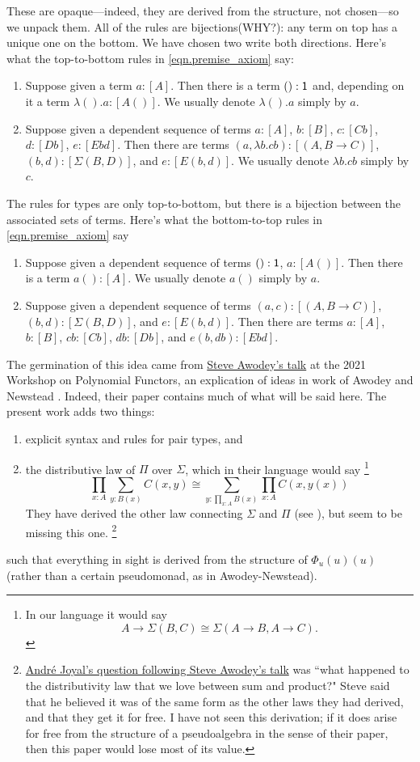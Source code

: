 \documentclass[11pt, one side, article]{memoir}
\theoremstyle{definition}
\theoremstyle{plain}
\newcommand{\0}{\textsf{0}}
\newcommand{\1}{\tn{\textsf{1}}}
\begin{document}
These are opaque---indeed, they are derived from the structure, not chosen---so we unpack them. All of the rules are bijections(WHY?): any term on top has a unique one on the bottom. We have chosen two write both directions. Here's what the top-to-bottom rules in \eqref{eqn.premise_axiom} say:
\begin{enumerate}
	\item Suppose given a term $a:[A]$. Then there is a term $():\1$ and, depending on it a term $\lambda ().a:[A()]$. We usually denote $\lambda ().a$ simply by $a$.
	\item Suppose given a dependent sequence of terms $a:[A]$, $b:[B]$, $c:[C b]$, $d:[D b]$, $e: [E b d]$. Then there are terms $(a,\lambda b.cb):[(A,B\to C)]$, $(b, d):[\Sigma(B,D)]$, and $e:[E(b,d)]$. We usually denote $\lambda b.cb$ simply by $c$.
\end{enumerate}
The rules for types are only top-to-bottom, but there is a bijection between the associated sets of terms. Here's what the bottom-to-top rules in \eqref{eqn.premise_axiom} say
\begin{enumerate}[resume]
	\item Suppose given a dependent sequence of terms $():\1$, $a:[A()]$. Then there is a term $a():[A]$. We usually denote $a()$ simply by $a$.
	\item Suppose given a dependent sequence of terms $(a,c):[(A,B\to C)]$, $(b,d):[\Sigma(B,D)]$, and $e:[E(b,d)]$. Then there are terms $a:[A]$, $b:[B]$, $cb:[Cb]$, $db:[Db]$, and $e(b,db):[E b d]$.
\end{enumerate}

The germination of this idea came from \href{https://www.youtube.com/watch?v=RDuNIP4icKI\&t=10765s}{Steve Awodey's talk} at the 2021 Workshop on Polynomial Functors, an explication of ideas in work of Awodey and Newstead \cite{awodey2018polynomial}. Indeed, their paper contains much of what will be said here. The present work adds two things:
\begin{enumerate}
	\item explicit syntax and rules for pair types, and
	\item the distributive law of $\Pi$ over $\Sigma$, which in their language would say%
	\footnote{In our language it would say 
	\[
	A\to\Sigma(B,C)\cong \Sigma(A\to B,A\to C).
	\]
	}
	\[
	\prod_{x:A}\sum_{y:B(x)}C(x,y)\cong\sum_{y:\prod_{x:A}B(x)}\prod_{x:A}C(x,y(x))
	\]
	They have derived the other law connecting $\Sigma$ and $\Pi$ (see \cite[Remark 4.2]{awodey2018polynomial}), but seem to be missing this one.%
	\footnote{\href{https://youtu.be/RDuNIP4icKI?t=13898}{Andr\'{e} Joyal's question following Steve Awodey's talk} was ``what happened to the distributivity law that we love between sum and product?" Steve said that he believed it was of the same form as the other laws they had derived, and that they get it for free. I have not seen this derivation; if it does arise for free from the structure of a pseudoalgebra in the sense of their paper, then this paper would lose most of its value.
	}
\end{enumerate}
such that everything in sight is derived from the structure of $\Phi_u(u)(u)$ (rather than a certain pseudomonad, as in Awodey-Newstead).
\end{document}
